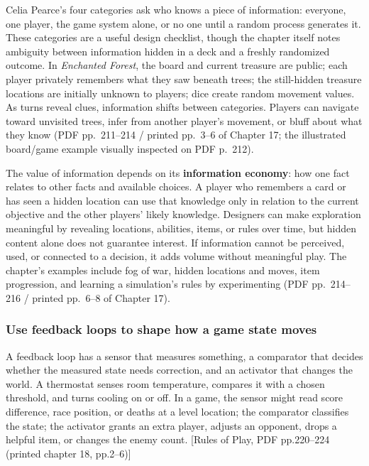 Celia Pearce's four categories ask who knows a piece of information: everyone, one player, the game system alone, or no one until a random process generates it. These categories are a useful design checklist, though the chapter itself notes ambiguity between information hidden in a deck and a freshly randomized outcome. In \emph{Enchanted Forest}, the board and current treasure are public; each player privately remembers what they saw beneath trees; the still-hidden treasure locations are initially unknown to players; dice create random movement values. As turns reveal clues, information shifts between categories. Players can navigate toward unvisited trees, infer from another player's movement, or bluff about what they know (PDF pp.~211--214 / printed pp.~3--6 of Chapter 17; the illustrated board/game example visually inspected on PDF p.~212).

The value of information depends on its \textbf{information economy}: how one fact relates to other facts and available choices. A player who remembers a card or has seen a hidden location can use that knowledge only in relation to the current objective and the other players' likely knowledge. Designers can make exploration meaningful by revealing locations, abilities, items, or rules over time, but hidden content alone does not guarantee interest. If information cannot be perceived, used, or connected to a decision, it adds volume without meaningful play. The chapter's examples include fog of war, hidden locations and moves, item progression, and learning a simulation's rules by experimenting (PDF pp.~214--216 / printed pp.~6--8 of Chapter 17).

\subsubsection{Use feedback loops to shape how a game state moves}\label{05-engine-i-ch009-use-feedback-loops-to-shape-how-a-game-state-moves}

\hypertarget{05-engine-i-ch009-use-feedback-loops-to-shape-how-a-game-state-moves}{}

A feedback loop has a sensor that measures something, a comparator that decides whether the measured state needs correction, and an activator that changes the world. A thermostat senses room temperature, compares it with a chosen threshold, and turns cooling on or off. In a game, the sensor might read score difference, race position, or deaths at a level location; the comparator classifies the state; the activator grants an extra player, adjusts an opponent, drops a helpful item, or changes the enemy count. {[}Rules of Play, PDF pp.220--224 (printed chapter 18, pp.2--6){]}

